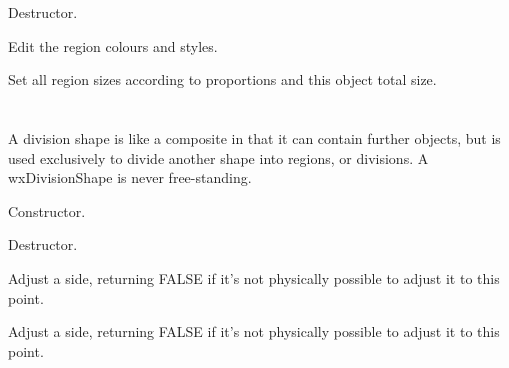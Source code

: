 
Destructor.



Edit the region colours and styles.



Set all region sizes according to proportions and
this object total size.

\section{}\label{wxdivisionshape}

A division shape is like a composite in that it can contain further objects, but is used exclusively to
divide another shape into regions, or divisions. A wxDivisionShape is never free-standing.








Constructor.



Destructor.



Adjust a side, returning FALSE if it's not physically possible to adjust it to this point.



Adjust a side, returning FALSE if it's not physically possible to adjust it to this point.

